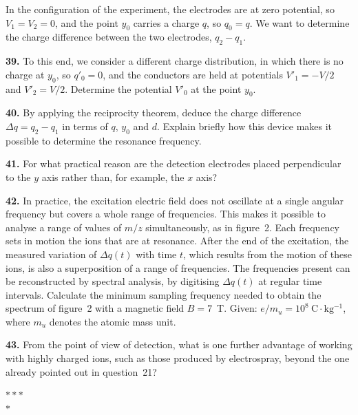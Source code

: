 \documentclass[11pt,a4paper]{article}
\newcommand{\q}[1]{\par\medskip\noindent\textbf{#1.}\enspace}
\begin{document}
In the configuration of the experiment, the electrodes are at zero potential, so
$V_1 = V_2 = 0$, and the point $y_0$ carries a charge $q$, so $q_0 = q$. We want to determine
the charge difference between the two electrodes, $q_2 - q_1$.

\q{39} To this end, we consider a different charge distribution, in which there is no charge at
$y_0$, so $q'_0 = 0$, and the conductors are held at potentials $V'_1 = -V/2$ and
$V'_2 = V/2$. Determine the potential $V'_0$ at the point $y_0$.

\q{40} By applying the reciprocity theorem, deduce the charge difference $\Delta q = q_2 - q_1$
in terms of $q$, $y_0$ and $d$. Explain briefly how this device makes it possible to determine
the resonance frequency.

\q{41} For what practical reason are the detection electrodes placed perpendicular to the $y$
axis rather than, for example, the $x$ axis?

\q{42} In practice, the excitation electric field does not oscillate at a single angular
frequency but covers a whole range of frequencies. This makes it possible to analyse a range of
values of $m/z$ simultaneously, as in figure~2. Each frequency sets in motion the ions that are
at resonance. After the end of the excitation, the measured variation of $\Delta q(t)$ with
time $t$, which results from the motion of these ions, is also a superposition of a range of
frequencies. The frequencies present can be reconstructed by spectral analysis, by digitising
$\Delta q(t)$ at regular time intervals. Calculate the minimum sampling frequency needed to
obtain the spectrum of figure~2 with a magnetic field $B = 7$~T. Given:
$e/m_u = 10^8~\mathrm{C\cdot kg^{-1}}$, where $m_u$ denotes the atomic mass unit.

\q{43} From the point of view of detection, what is one further advantage of working with
highly charged ions, such as those produced by electrospray, beyond the one already pointed out
in question~21?

\begin{center}$\ast\ast\ast$\\$\ast$\end{center}
\end{document}
